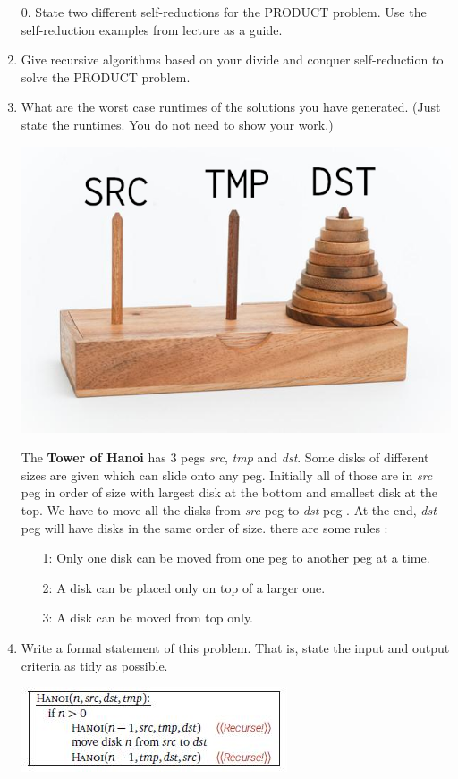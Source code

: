 \documentclass[12pt]{article}
\begin{document}
\begin{enumerate}
\item[0. ] State two different self-reductions for the PRODUCT problem. Use the self-reduction 
examples from lecture as a guide. 
\newpage
\item Give recursive algorithms based on your divide and conquer self-reduction to solve 
the PRODUCT problem. 
\item What are the worst case runtimes of the solutions you have generated. (Just state the runtimes. 
You do not need to show your work.)
\newpage
\centerline{\includegraphics[scale = 1.2]{h0.jpg}}
The \textbf{Tower of Hanoi} has 3 pegs \textit{src}, \textit{tmp} and \textit{dst}. Some disks of different sizes are given which
can slide onto any peg. Initially all of those are in \textit{src} peg in order of size with
largest disk at the bottom and smallest disk at the top. We have to move all the disks
from \textit{src} peg to \textit{dst} peg . At the end, \textit{dst} peg will have disks in the same order of
size. there are some rules :
\begin{enumerate}
    \item[1: ] Only one disk can be moved from one peg to another peg at a time.
    \item[2: ] A disk can be placed only on top of a larger one.
    \item[3: ] A disk can be moved from top only. 
\end{enumerate}
\item  Write a formal statement of this problem. That is, state the input and output criteria as tidy 
as possible.
\newpage
\centerline{\includegraphics[scale = 0.8]{hanoi.JPG}}

\end{enumerate}
\end{document}
